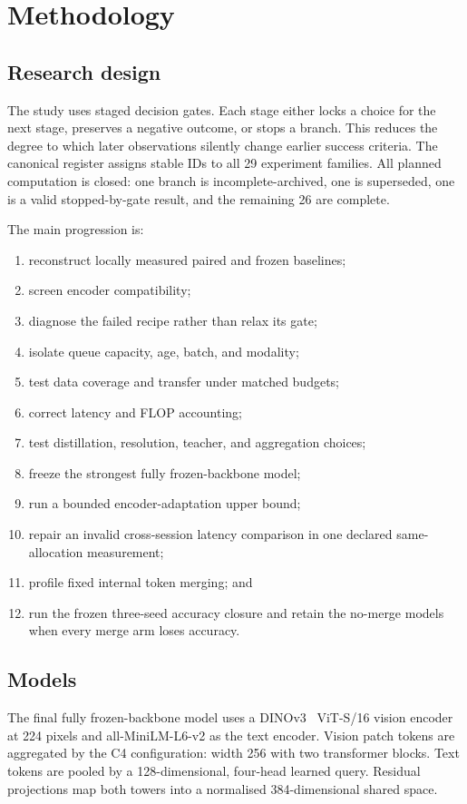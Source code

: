 \chapter{Methodology}
\section{Research design}
The study uses staged decision gates. Each stage either locks a choice for the next stage, preserves a negative outcome, or stops a branch. This reduces the degree to which later observations silently change earlier success criteria. The canonical register assigns stable IDs to all 29 experiment families. All planned computation is closed: one branch is incomplete-archived, one is superseded, one is a valid stopped-by-gate result, and the remaining 26 are complete.

The main progression is:

\begin{enumerate}
\item reconstruct locally measured paired and frozen baselines;
\item screen encoder compatibility;
\item diagnose the failed recipe rather than relax its gate;
\item isolate queue capacity, age, batch, and modality;
\item test data coverage and transfer under matched budgets;
\item correct latency and FLOP accounting;
\item test distillation, resolution, teacher, and aggregation choices;
\item freeze the strongest fully frozen-backbone model;
\item run a bounded encoder-adaptation upper bound;
\item repair an invalid cross-session latency comparison in one declared same-allocation measurement;
\item profile fixed internal token merging; and
\item run the frozen three-seed accuracy closure and retain the no-merge models when every merge arm loses accuracy.
\end{enumerate}
\section{Models}
The final fully frozen-backbone model uses a DINOv3~\cite{simeoni2025dinov3} ViT-S/16 vision encoder at 224 pixels and all-MiniLM-L6-v2 as the text encoder. Vision patch tokens are aggregated by the C4 configuration: width 256 with two transformer blocks. Text tokens are pooled by a 128-dimensional, four-head learned query. Residual projections map both towers into a normalised 384-dimensional shared space.

